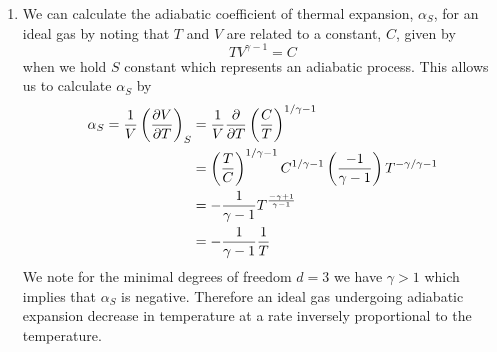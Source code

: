 \documentclass[11pt]{article}
\numberwithin{equation}{section}
\begin{document}
\begin{enumerate}[(1)]
\item We can calculate the adiabatic coefficient of thermal expansion, $\alpha_S$, for an
ideal gas by noting that $T$ and $V$ are related to a constant, $C$, given by
$$TV^{\gamma-1} = C$$
when we hold $S$ constant which represents an adiabatic process. This allows us to calculate
$\alpha_S$ by
\begin{align*}
\alpha_S = \frac{1}{V}\left(\frac{\partial{V}}{\partial{T}}\right)_{S} &= \frac{1}{V}\frac{\partial{}}{\partial{T}}\left(\frac{C}{T}\right)^{1/\gamma-1}\\
&= \left(\frac{T}{C}\right)^{1/\gamma-1}C^{1/\gamma-1}\left(\frac{-1}{\gamma-1}\right)T^{-\gamma/\gamma-1}\\
&= -\frac{1}{\gamma-1}T^{\frac{-\gamma+1}{\gamma-1}}\\
&= -\frac{1}{\gamma-1}\frac{1}{T}
\end{align*}
We note for the minimal degrees of freedom $d=3$ we have $\gamma>1$ which implies that 
$\alpha_S$ is negative. Therefore an ideal gas undergoing adiabatic expansion decrease in 
temperature at a rate inversely proportional to the temperature.
\end{enumerate}

\pagebreak
\end{document}

